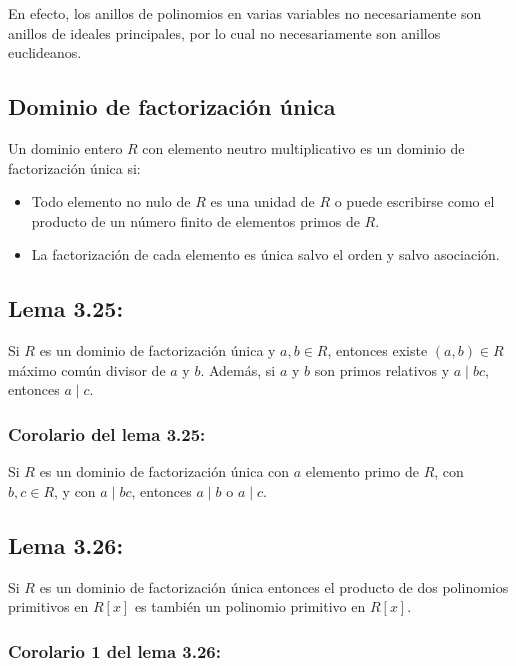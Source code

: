 \documentclass{article}
\begin{document}
En efecto, los anillos de polinomios en varias variables no necesariamente son anillos de ideales principales, por lo cual no necesariamente son anillos euclideanos.

\subsection*{\color{violet} Dominio de factorización única}

Un dominio entero $R$ con elemento neutro multiplicativo es un dominio de factorización única si:

\begin{itemize}

\item Todo elemento no nulo de $R$ es una unidad de $R$ o puede escribirse como el producto de un número finito de elementos primos de $R$.

\item La factorización de cada elemento es única salvo el orden y salvo asociación.

\end{itemize}

\subsection*{\color{blue} Lema 3.25:}

Si $R$ es un dominio de factorización única y $a,b\in R$, entonces existe $(a,b)\in R$ máximo común divisor de $a$ y $b$. Además, si $a$ y $b$ son primos relativos y $a\mid bc$, entonces $a\mid c$.

\subsubsection*{\color{blue} Corolario del lema 3.25:}

Si $R$ es un dominio de factorización única con $a$ elemento primo de $R$, con $b,c\in R$, y con $a\mid bc$, entonces $a\mid b$ o $a\mid c$.

\subsection*{\color{blue} Lema 3.26:}

Si $R$ es un dominio de factorización única entonces el producto de dos polinomios primitivos en $R[x]$ es también un polinomio primitivo en $R[x]$.

\subsubsection*{\color{blue} Corolario 1 del lema 3.26:}
\end{document}
